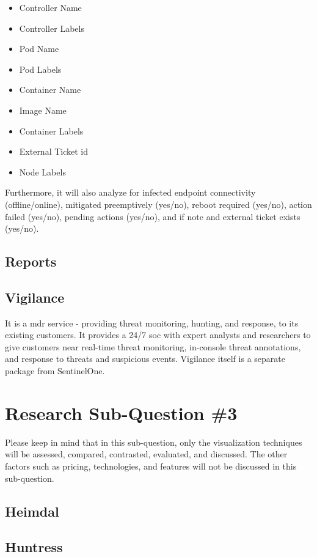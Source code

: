 \begin{multicols}{2}
\begin{itemize}
            \item Controller Name
            \item Controller Labels
            \item Pod Name
            \item Pod Labels
            \item Container Name
            \item Image Name
            \item Container Labels
            \item External Ticket \acrshort{id}
            \item Node Labels
      \end{itemize}

      Furthermore, it will also analyze for infected endpoint connectivity (offline/online), mitigated preemptively (yes/no),
      reboot required (yes/no), action failed (yes/no), pending actions (yes/no), and if note and external ticket exists (yes/no).
      \subsection{Reports}
      \subsection{Vigilance}
      It is a \acrshort{mdr} service - providing threat monitoring, hunting, and response, to its existing customers. It
      provides a 24/7 \acrshort{soc} with expert analysts and researchers to give customers near real-time threat monitoring,
      in-console threat annotations, and response to threats and suspicious events. Vigilance itself is a separate package from
      SentinelOne.
      \section{Research Sub-Question \#3}
      Please keep in mind that in this sub-question, only the visualization techniques will be assessed, compared, contrasted,
      evaluated, and discussed. The other factors such as pricing, technologies, and features will not be discussed in this sub-question.
      \subsection{Heimdal\textregistered}
      \subsection{Huntress}

\end{multicols}
